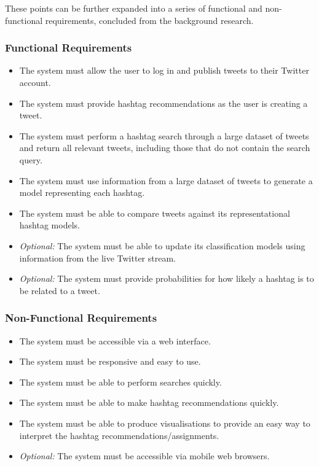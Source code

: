 \documentclass[12pt,a4paper]{article}
\begin{document}
These points can be further expanded into a series of functional and non-functional requirements, concluded from the background research.

\subsubsection{Functional Requirements}
\begin{itemize}
    \item The system must allow the user to log in and publish tweets to their Twitter account.
    \item The system must provide hashtag recommendations as the user is creating a tweet.
    \item The system must perform a hashtag search through a large dataset of tweets and return all relevant tweets, including those that do not contain the search query.
    \item The system must use information from a large dataset of tweets to generate a model representing each hashtag.
    \item The system must be able to compare tweets against its representational hashtag models.
    \item \emph{Optional:} The system must be able to update its classification models using information from the live Twitter stream.
    \item \emph{Optional:} The system must provide probabilities for how likely a hashtag is to be related to a tweet.
\end{itemize}

\subsubsection{Non-Functional Requirements}
\begin{itemize}
    \item The system must be accessible via a web interface.
    \item The system must be responsive and easy to use.
    \item The system must be able to perform searches quickly.
    \item The system must be able to make hashtag recommendations quickly.
    \item The system must be able to produce visualisations to provide an easy way to interpret the hashtag recommendations/assignments.
    \item \emph{Optional:} The system must be accessible via mobile web browsers.
\end{itemize}
\end{document}
